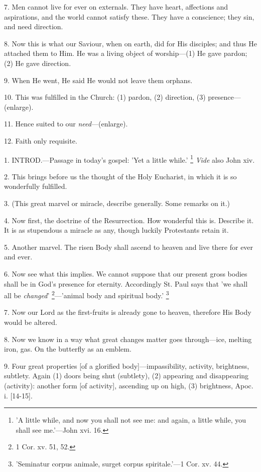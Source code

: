 7. Men cannot live for ever on externals. They
have heart, affections and aspirations, and the world cannot satisfy
these. They have a conscience; they sin, and need direction.

8. Now this is what our Saviour, when on earth,
did for His disciples; and thus He attached them to Him. He was a
living object of worship—(1) He gave pardon; (2) He gave direction.

9. When He went, He said He would not leave them
orphans.

10. This was fulfilled in the Church: (1) pardon,
(2) direction, (3) presence—(enlarge).

11. Hence suited to our \emph{need}—(enlarge).

12. Faith only requisite.


1. INTROD.—Passage
in today's gospel: 'Yet a little while.' \footnote{'A little while, and now
you shall not see me: and again, a little while, you shall see
me.'—John xvi. 16.} \emph{Vide} also John xiv.

2. This brings before us the thought of the Holy
Eucharist, in which it is so wonderfully fulfilled.

3. (This great marvel or miracle, describe
generally. Some remarks on it.)

4. Now first, the doctrine of the Resurrection.
How wonderful this is. Describe it. It is as stupendous a miracle as
any, though luckily Protestants retain it.

5. Another marvel. The risen Body shall ascend to
heaven and live there for ever and ever.

6. Now see what this implies. We cannot suppose
that our present gross bodies shall be in God's presence for eternity.
Accordingly St. Paul says that 'we shall all be \emph{changed}' \footnote{1 Cor. xv. 51, 52.}—'animal body and spiritual body.' \footnote{'Seminatur corpus animale,
surget corpus spiritale.'—1 Cor. xv. 44.}

7. Now our Lord as the first-fruits is already
gone to heaven, therefore His Body would be altered.

8. Now we know in a way what great changes matter
goes through—ice, melting iron, gas. On the butterfly as an emblem.

9. Four great properties [of a glorified
body]—impassibility, activity, brightness, subtlety. Again (1) doors
being shut (subtlety), (2) appearing and disappearing (activity):
another form [of activity], ascending up on high, (3) brightness, Apoc.
i. [14-15].

